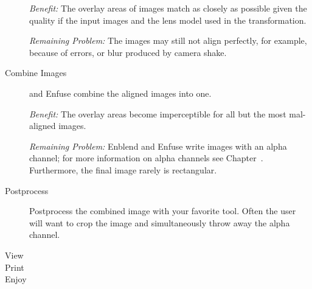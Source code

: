 \begin{description}
  \noindent\emph{Benefit:} The overlay areas of images match as
  closely as possible given the quality if the input images and the
  lens model used in the transformation.

  \noindent\emph{Remaining Problem:} The images may still not align
  perfectly, for example, because of
   errors,
  or blur produced by camera shake.

\item[Combine Images]\itemend {} and
   Enfuse combine the aligned images into one.

  \noindent\emph{Benefit:} The overlay areas become imperceptible for
  all but the most mal-aligned images.

  \noindent\emph{Remaining Problem:} Enblend and Enfuse write images
  with an alpha channel; 
  for more information on alpha channels see
  Chapter~.  Furthermore, the final
  image rarely is rectangular.

\item[Postprocess]\itemend Postprocess the combined image with your
  favorite tool.  Often the user will want to crop the image and
  simultaneously throw away the alpha channel.

\item[View]

\item[Print]

\item[Enjoy]
\end{description}
